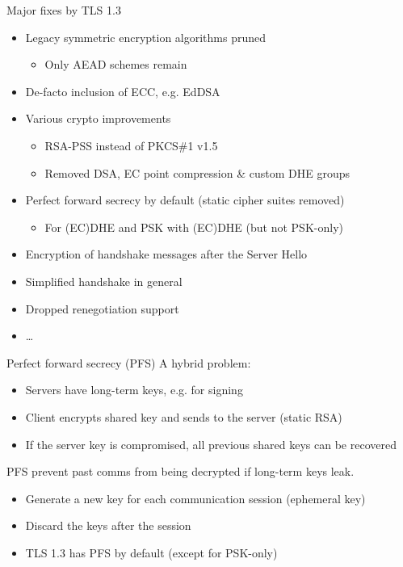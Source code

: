\begin{frame}{Major fixes by TLS 1.3}
  \begin{itemize}
    \item Legacy symmetric encryption algorithms pruned
    \begin{itemize}
      \item Only AEAD schemes remain
    \end{itemize}
    \item De-facto inclusion of ECC, e.g. EdDSA
    \item Various crypto improvements
    \begin{itemize}
      \item RSA-PSS instead of PKCS\#1 v1.5
      \item Removed DSA, EC point compression \& custom DHE groups
    \end{itemize}
    \item Perfect forward secrecy by default (static cipher suites removed)
    \begin{itemize}
      \item For (EC)DHE and PSK with (EC)DHE (but not PSK-only)
    \end{itemize}
    \item Encryption of handshake messages after the Server Hello
    \item Simplified handshake in general
    \item Dropped renegotiation support
    \item \dots
  \end{itemize}
\end{frame}

\begin{frame}{Perfect forward secrecy (PFS)}
  A hybrid problem:
  \begin{itemize}[<+(1)->]
    \item Servers have long-term keys, e.g. for signing
    \item Client encrypts shared key and sends to the server (static RSA)
    \item If the server key is compromised, all previous shared keys can be recovered
  \end{itemize}

  \vspace*{1em}

  \pause
  PFS prevent past comms from being decrypted if long-term keys leak.
  \begin{itemize}[<+(1)->]
    \item Generate a new key for each communication session (ephemeral key)
    \item Discard the keys after the session
    \item TLS 1.3 has PFS by default (except for PSK-only)
  \end{itemize}
\end{frame}

